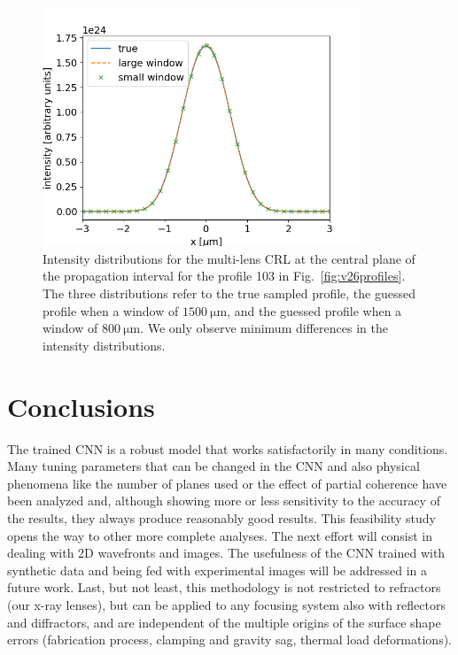 \documentclass[preprint]{iucr}
\newcommand{\inred}[1]{{\color{red}#1}}
\begin{document}
\begin{figure}\label{fig:figure8}
\includegraphics[width=0.85\textwidth]{figures/figure8.png}

\caption{
Intensity distributions for the multi-lens CRL at the central plane of the propagation interval for the profile 103 in Fig.~\ref{fig:v26profiles}. The three distributions refer to the true sampled profile, the guessed profile when a window of $\SI{1500}{\micro\meter}$, and the guessed profile when a window of $\SI{800}{\micro\meter}$. We only observe  minimum differences in the intensity distributions.
    }
\end{figure}

\section{Conclusions}\label{sec:conclusions}

The trained CNN is a robust model that works satisfactorily in many conditions. Many tuning parameters that can be changed in the CNN and also physical phenomena like the number of planes used or the effect of partial coherence have been analyzed and, although showing more or less sensitivity to the accuracy of the results, they always produce reasonably good results. This feasibility study opens the way to other more complete analyses. The next effort will consist in dealing with 2D wavefronts and images.  
The usefulness of the CNN trained with synthetic data and being fed with  experimental images will be addressed in a future work.
\inred{Last, but not least, this methodology is not restricted to refractors (our x-ray lenses), but can be applied to any focusing system also with reflectors and diffractors, and are independent of the multiple origins of the surface shape errors (fabrication process, clamping and gravity sag, thermal load deformations). }
\end{document}

